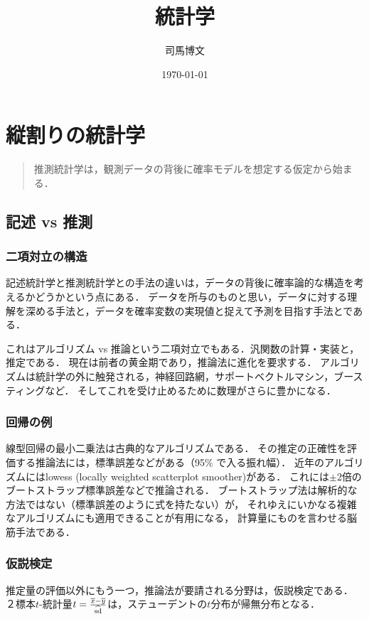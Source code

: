 \documentclass[uplatex,dvipdfmx]{jsreport}
\title{統計学}
\author{司馬博文}
\date{\today}
\begin{document}
\tableofcontents

\chapter{縦割りの統計学}

\begin{quotation}
    推測統計学は，観測データの背後に確率モデルを想定する仮定から始まる．
\end{quotation}

\section{記述 vs 推測}

\subsection{二項対立の構造}

記述統計学と推測統計学との手法の違いは，データの背後に確率論的な構造を考えるかどうかという点にある．
データを所与のものと思い，データに対する理解を深める手法と，データを確率変数の実現値と捉えて予測を目指す手法とである．

これはアルゴリズム vs 推論という二項対立でもある．汎関数の計算・実装と，推定である．
現在は前者の黄金期であり，推論法に進化を要求する．
アルゴリズムは統計学の外に触発される，神経回路網，サポートベクトルマシン，ブースティングなど．
そしてこれを受け止めるために数理がさらに豊かになる．

\subsection{回帰の例}

線型回帰の最小二乗法は古典的なアルゴリズムである．
その推定の正確性を評価する推論法には，標準誤差などがある（95\% で入る振れ幅）．
近年のアルゴリズムにはlowess (locally weighted scatterplot smoother)がある．
これには$\pm 2$倍のブートストラップ標準誤差などで推論される．
ブートストラップ法は解析的な方法ではない（標準誤差のように式を持たない）が，
それゆえにいかなる複雑なアルゴリズムにも適用できることが有用になる，
計算量にものを言わせる脳筋手法である．

\subsection{仮説検定}

推定量の評価以外にもう一つ，推論法が要請される分野は，仮説検定である．
２標本$t$-統計量$t=\frac{\overline{x}-\overline{y}}{\widehat{\mathrm{sd}}}$は，ステューデントの$t$分布が帰無分布となる．
\end{document}
